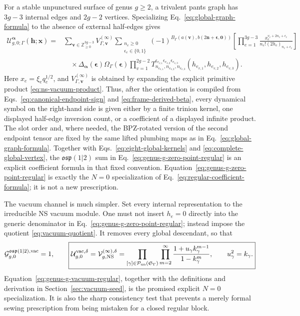 \documentclass[11pt]{article}
\newcommand{\NS}{\mathrm{NS}}
\newcommand{\osp}{\mathfrak{osp}(1|2)}
\newcommand{\G}{\mathcal G}
\newcommand{\V}{\mathcal V}
\newcommand{\U}{\mathcal U}
\begin{document}
For a stable unpunctured surface of genus \(g\ge2\), a trivalent pants graph
has \(3g-3\) internal edges and \(2g-2\) vertices.  Specializing
Eq.~\eqref{eq:global-graph-formula} to the absence of external half-edges
gives
\begin{equation}
\boxed{
\begin{aligned}
 \U_{g,0;\Gamma}^{\bm\alpha}
 (\bm h;\bm x)
 ={}&\sum_{\bm v\in\mathbb Z_{\ge0}^{3g-3}}
 V_{\Gamma,\bm v}^{(\infty)}
 \sum_{\substack{n_e\ge0\\\epsilon_e\in\{0,1\}}}
 (-1)^{B_\Gamma(a(\bm v),b(2\bm n+\bm\epsilon,\bm0))}
 \left[
  \prod_{e=1}^{3g-3}
  \frac{x_e^{v_e+2n_e+\epsilon_e}}
       {n_e!(2h_e)_{n_e+\epsilon_e}}
 \right]
 \\
 &\quad\times
 \Delta_{\bm\alpha}(\bm\epsilon)
 \Omega_\Gamma(\bm\epsilon)
 \prod_{v=1}^{2g-2}
 T_{n_{e_{v,1}},n_{e_{v,2}},n_{e_{v,3}}}^
   {\epsilon_{e_{v,1}}\epsilon_{e_{v,2}}\epsilon_{e_{v,3}}}
 (h_{e_{v,1}},h_{e_{v,2}},h_{e_{v,3}}).
\end{aligned}}
\label{eq:genus-g-zero-point-regular}
\end{equation}
Here \(x_e=\xi_e q_e^{1/2}\), and
\(V_{\Gamma,\bm v}^{(\infty)}\) is obtained by expanding the explicit
primitive product \eqref{eq:ns-vacuum-product}.  Thus, after the orientation
is compiled from Eqs.~\eqref{eq:canonical-endpoint-sign} and
\eqref{eq:frame-derived-beta}, every dynamical symbol on the right-hand side is given
either by a finite trinion kernel, one displayed half-edge inversion count,
or a coefficient of a displayed infinite product.
The slot order and, where needed, the BPZ-rotated version of the second
endpoint tensor are fixed by the same lifted plumbing maps as in
Eq.~\eqref{eq:global-graph-formula}.  Together with Eqs.~\eqref{eq:eight-global-kernels} and
\eqref{eq:complete-global-vertex}, the \(\osp\) sum in
Eq.~\eqref{eq:genus-g-zero-point-regular} is an explicit coefficient formula
in that fixed convention.  Equation~\eqref{eq:genus-g-zero-point-regular} is
exactly the \(N=0\) specialization of
Eq.~\eqref{eq:regular-coefficient-formula}; it is not a new prescription.

The vacuum channel is much simpler.  Set every internal representation to
the irreducible NS vacuum module.  One must not insert \(h_e=0\) directly
into the generic denominator in
Eq.~\eqref{eq:genus-g-zero-point-regular}; instead impose the quotient
\eqref{eq:vacuum-quotient}.  It removes every global descendant, so that
\begin{equation}
 \G_{g,0}^{\osp,\mathrm{vac}}=1,
 \qquad
 \boxed{
 \U_{g,0}^{\mathrm{vac},\delta}
 =\V_{g,\NS}^{(\infty),\delta}
 =\prod_{[\gamma]\in\mathcal P_{\rm un}(\mathfrak S_\Gamma)}
   \prod_{m=2}^{\infty}
   \frac{1+u_\gamma k_\gamma^{m-1}}
        {1-k_\gamma^m},
 \qquad u_\gamma^2=k_\gamma.}
 \label{eq:genus-g-vacuum-regular}
\end{equation}
Equation~\eqref{eq:genus-g-vacuum-regular}, together with the definitions and
derivation in Section~\ref{sec:vacuum-seed}, is the promised explicit \(N=0\)
specialization.  It is also the sharp consistency test that prevents a merely
formal sewing prescription from being mistaken for a closed regular block.
\end{document}
